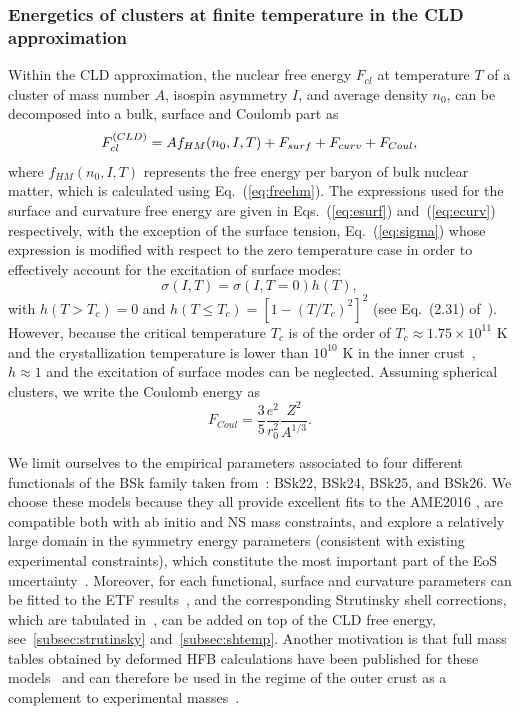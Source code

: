 \subsubsection{Energetics of clusters at finite temperature in the CLD
approximation}

Within the CLD approximation, the nuclear free energy $F_{cl}$ at temperature 
$T$ of a cluster of mass number $A$, isospin asymmetry $I$, and average density 
$n_0$, can be decomposed into a bulk, surface and Coulomb part as
%
\begin{equation}
  F_{cl}^{\text(CLD)} = A f_{HM}(n_0,I,T) + F_{surf} + F_{curv} + F_{Coul},
\end{equation}
%
where $f_{HM}(n_0, I, T)$ represents the free energy per baryon of bulk nuclear
matter, which is calculated using Eq.~(\ref{eq:freehm}).
The expressions used for the surface and curvature free energy are given
in Eqs.~(\ref{eq:esurf}) and~(\ref{eq:ecurv}) respectively, with the exception
of the surface tension, Eq.~(\ref{eq:sigma}) whose expression is modified with 
respect to the zero temperature case in order to effectively account for the 
excitation of surface modes:
%
\begin{equation}
  \sigma(I,T) = \sigma(I, T=0)h(T), 
\end{equation}
%
with $h(T>T_c) = 0$ and $h(T \leq T_c) = [1-(T/T_c)^2]^2$ (see Eq.~(2.31)
of~\cite{Lattimer1991}).
However, because the critical temperature $T_c$ is of the order of 
$T_c \approx 1.75 \times 10^{11}$ K and the crystallization temperature is 
lower than $10^{10}$ K in the inner crust~\cite{Haensel2007}, $h\approx 1$ and 
the excitation of surface modes can be neglected.
Assuming spherical clusters, we write the Coulomb energy as
%
\begin{equation}
  F_{Coul} = \frac{3}{5}\frac{e^2}{r_0^2}\frac{Z^2}{A^{1/3}}.
\end{equation}
%

We limit ourselves to the empirical parameters 
associated to four different functionals of the BSk family taken 
from~\cite{Goriely2013}: BSk22, BSk24, BSk25, and BSk26.
We choose these models because they all provide excellent fits to the 
AME2016 \cite{Huang2017}, are compatible both with ab initio and NS mass 
constraints, and explore a relatively large domain in the symmetry energy 
parameters (consistent with existing experimental constraints), which 
constitute the most important part of the EoS 
uncertainty~\cite{Pearson2014,Pearson2018}. Moreover, for each functional, 
surface and curvature parameters can be fitted to the ETF 
results~\cite{Pearson2019}, and the corresponding Strutinsky shell corrections, 
which are tabulated in~\cite{Pearson2018}, can be added on top of the CLD free 
energy, see~\ref{subsec:strutinsky} and~\ref{subsec:shtemp}.
Another motivation is that full mass tables obtained by deformed HFB 
calculations have been published for these models~\cite{Xu2013} and can 
therefore be used in the regime of the outer crust as a
complement to experimental masses~\cite{Fantina2020}.

